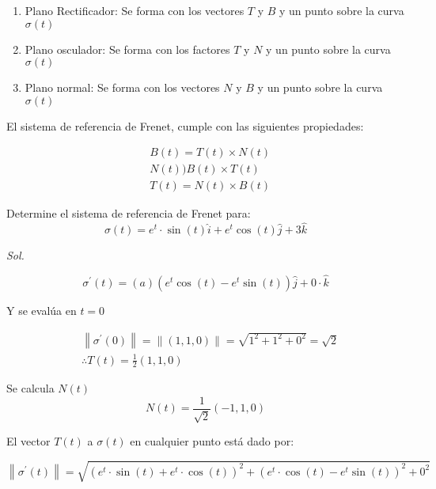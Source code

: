 \begin{enumerate}
	\item Plano Rectificador: Se forma con los vectores $T$ y $B$ y un punto sobre la curva $\sigma(t)$
	\item Plano osculador: Se forma con los factores $T$ y $N$ y un punto sobre la curva $\sigma(t)$
	\item Plano normal: Se forma con los vectores $N$ y $B$ y un punto sobre la curva $\sigma(t)$
\end{enumerate}

El sistema de referencia de Frenet, cumple con las siguientes propiedades:

\begin{align}
	 & B(t)=T(t)\times N(t) \\
	 & N(t))B(t)\times T(t) \\
	 & T(t)=N(t)\times B(t)
\end{align}

\begin{example}
	Determine el sistema de referencia de Frenet para:
	\begin{equation*}
		\sigma(t)=e^t\cdot\sin{(t)}\hat{i}+e^t\cos{(t)}\hat{j}+3\hat{k}
	\end{equation*}
\end{example}

\textit{ Sol. }

\begin{equation*}
	\sigma^{\prime}(t)=\left(a\right)  \left(e^t\cos{(t)}-e^t\sin{(t)}\right)\hat{j}+0\cdot \hat{k}
\end{equation*}

Y se evalúa en $t=0$

\begin{align*}
	 & \left\lVert \sigma^{\prime}(0)\right\rVert=\left\lVert (1,1,0)\right\rVert=\sqrt{1^2+1^2+0^2}=\sqrt{2} \\
	 & \therefore T(t)=\frac{1}{2}(1,1,0)
\end{align*}

Se calcula $N(t)$
\begin{equation*}
	N(t)=\frac{1}{\sqrt{2}}(-1,1,0)
\end{equation*}

El vector $T(t)$ a $\sigma(t)$ en cualquier punto está dado por:

\begin{equation*}
	\left\lVert \sigma^{\prime}(t)\right\rVert =\sqrt{\left(e^t\cdot \sin{(t)}+e^t\cdot \cos{(t)}\right)^2+\left(e^t\cdot\cos{(t)}-e^t\sin{(t)}\right)^2+0^2}
\end{equation*}


